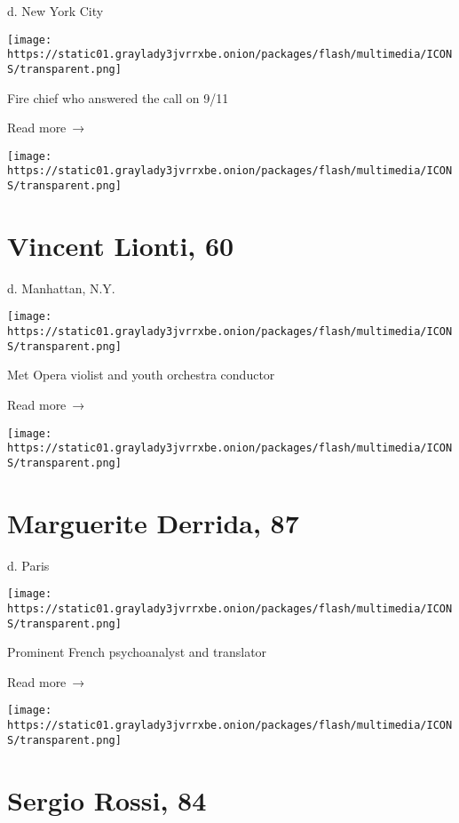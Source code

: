 d. New York City

\texttt{[image: https://static01.graylady3jvrrxbe.onion/packages/flash/multimedia/ICONS/transparent.png]}

Fire chief who answered the call on 9/11

 Read more~→

\href{https://www.nytimes3xbfgragh.onion/2020/04/06/obituaries/vincent-lionti-dead-coronavirus.html}{}

\texttt{[image: https://static01.graylady3jvrrxbe.onion/packages/flash/multimedia/ICONS/transparent.png]}

\hypertarget{vincent-lionti-60}{%
\section{Vincent Lionti, 60}\label{vincent-lionti-60}}

d. Manhattan, N.Y.

\texttt{[image: https://static01.graylady3jvrrxbe.onion/packages/flash/multimedia/ICONS/transparent.png]}

Met Opera violist and youth orchestra conductor

 Read more~→

\href{https://www.nytimes3xbfgragh.onion/2020/04/06/obituaries/marguerite-derrida-dead-coronavirus.html}{}

\texttt{[image: https://static01.graylady3jvrrxbe.onion/packages/flash/multimedia/ICONS/transparent.png]}

\hypertarget{marguerite-derrida-87}{%
\section{Marguerite Derrida, 87}\label{marguerite-derrida-87}}

d. Paris

\texttt{[image: https://static01.graylady3jvrrxbe.onion/packages/flash/multimedia/ICONS/transparent.png]}

Prominent French psychoanalyst and translator

 Read more~→

\href{https://www.nytimes3xbfgragh.onion/2020/04/06/obituaries/sergio-rossi-dead-coronavirus.html}{}

\texttt{[image: https://static01.graylady3jvrrxbe.onion/packages/flash/multimedia/ICONS/transparent.png]}

\hypertarget{sergio-rossi-84}{%
\section{Sergio Rossi, 84}\label{sergio-rossi-84}}

